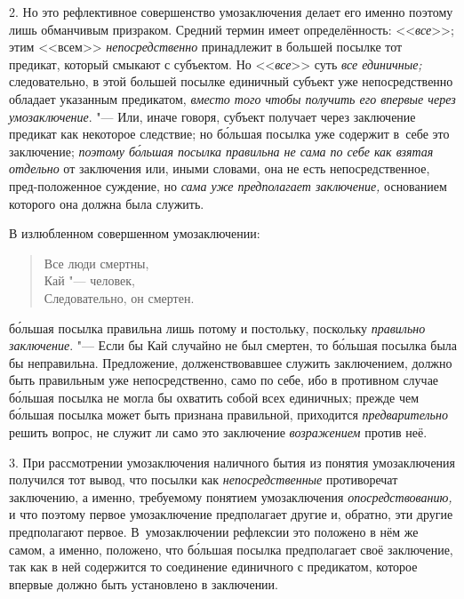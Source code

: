 2. Но это рефлективное совершенство умозаключения делает его
именно поэтому лишь обманчивым призраком. Средний термин имеет
определённость: <<{\em все}>>; этим <<всем>> {\em непосредственно}
принадлежит в большей посылке тот предикат, который смыкают с
субъектом. Но <<{\em все}>> суть {\em все единичные;}
следовательно, в этой большей посылке единичный субъект уже
непосредственно обладает указанным предикатом,
{\em вместо того чтобы получить его
впервые через умозаключение}. "--- Или, иначе говоря, субъект
получает через заключение предикат как некоторое следствие; но б\'{о}льшая
посылка уже содержит в~себе это заключение;
{\em поэтому б\'{о}льшая посылка правильна не сама
по себе как взятая отдельно} от заключения или, иными
словами, она не есть непосредственное, пред-положенное суждение, но
{\em сама уже предполагает заключение,}
основанием которого она должна была служить.

В излюбленном совершенном умозаключении:

\begin{verse}
Все люди смертны,\\
Кай "--- человек,\\
Следовательно, он смертен.
\end{verse}

\noindent б\'{о}льшая посылка правильна лишь потому и постольку, поскольку
{\em правильно заключение}. "---
Если бы Кай случайно не был смертен, то б\'{о}льшая посылка была
бы неправильна. Предложение, долженствовавшее служить заключением, должно
быть правильным уже непосредственно, само по себе, ибо в противном случае
б\'{о}льшая посылка не могла бы охватить собой всех единичных; прежде чем
б\'{о}льшая посылка может быть признана правильной, приходится
{\em предварительно} решить вопрос, не служит ли само это заключение
{\em возражением} против неё.

3. При рассмотрении умозаключения наличного бытия из понятия
умозаключения получился тот вывод, что посылки как {\em непосредственные}
противоречат заключению, а именно, требуемому понятием
умозаключения {\em опосредствованию,}
и что поэтому первое умозаключение предполагает другие и,
обратно, эти другие предполагают первое. В~умозаключении рефлексии это
положено в нём же самом, а именно, положено, что б\'{о}льшая
посылка предполагает своё заключение, так как в ней содержится то
соединение единичного с предикатом, которое впервые должно быть установлено
в заключении.

